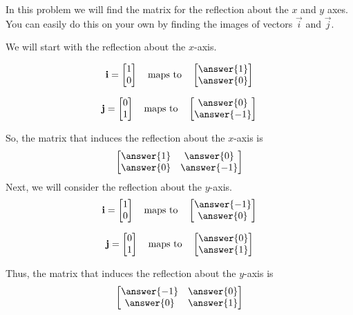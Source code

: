 \documentclass{ximera}
\begin{document}
\begin{exploration}\label{init:reflectionxyaxes}
In this problem we will find the matrix for the reflection about the $x$ and $y$ axes.  You can easily do this on your own by finding the images of vectors $\vec{i}$ and $\vec{j}$.  
  
  We will start with the reflection about the $x$-axis.
  
  $$\vec{i}=\begin{bmatrix}1\\0\end{bmatrix}\quad\text{maps to}\quad\begin{bmatrix}\answer{1}\\\answer{0}\end{bmatrix}$$
  
  $$\vec{j}=\begin{bmatrix}0\\1\end{bmatrix}\quad\text{maps to}\quad\begin{bmatrix}\answer{0}\\\answer{-1}\end{bmatrix}$$
  
  So, the matrix that induces the reflection about the $x$-axis is
  $$\begin{bmatrix}\answer{1}&\answer{0}\\\answer{0}&\answer{-1}\end{bmatrix}$$
Next, we will consider the reflection about the $y$-axis.
$$\vec{i}=\begin{bmatrix}1\\0\end{bmatrix}\quad\text{maps to}\quad\begin{bmatrix}\answer{-1}\\\answer{0}\end{bmatrix}$$
  
  $$\vec{j}=\begin{bmatrix}0\\1\end{bmatrix}\quad\text{maps to}\quad\begin{bmatrix}\answer{0}\\\answer{1}\end{bmatrix}$$
  
  Thus, the matrix that induces the reflection about the $y$-axis is
  $$\begin{bmatrix}\answer{-1}&\answer{0}\\\answer{0}&\answer{1}\end{bmatrix}$$
  
  \end{exploration}
  
\end{document}
